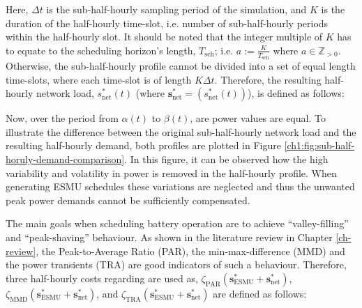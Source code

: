 Here, $\Delta t$ is the sub-half-hourly sampling period of the simulation, and $K$ is the duration of the half-hourly time-slot, i.e. number of sub-half-hourly periods within the half-hourly slot.
It should be noted that the integer multiple of $K$ has to equate to the scheduling horizon's length, $T_\text{sch}$; i.e. $a := \frac{K}{T_\text{sch}} \text{ where } a \in \mathbb{Z}_{>0}$.
Otherwise, the sub-half-hourly profile cannot be divided into a set of equal length time-slots, where each time-slot is of length $K\Delta t$.
Therefore, the resulting half-hourly network load, $s^{*}_\text{net}(t)$ (where $\textbf{s}^*_\text{net} = (s^*_\text{net}(t))$), is defined as follows:



Now, over the period from $\alpha(t)$ to $\beta(t)$, are power values are equal.
To illustrate the difference between the original sub-half-hourly network load and the resulting half-hourly demand, both profiles are plotted in Figure \ref{ch1:fig:sub-half-horuly-demand-comparison}.
In this figure, it can be observed how the high variability and volatility in power is removed in the half-hourly profile.
When generating ESMU schedules these variations are neglected and thus the unwanted peak power demands cannot be sufficiently compensated.



The main goals when scheduling battery operation are to achieve ``valley-filling'' and ``peak-shaving'' behaviour.
As shown in the literature review in Chapter \ref{ch-review}, the Peak-to-Average Ratio (PAR), the min-max-difference (MMD) and the power transients (TRA) are good indicators of such a behaviour.
Therefore, three half-hourly costs regarding are used as, $\zeta_\text{PAR}(\textbf{s}^*_\text{ESMU} + \textbf{s}^*_\text{net})$, $\zeta_\text{MMD}(\textbf{s}^*_\text{ESMU} + \textbf{s}^*_\text{net})$, and $\zeta_\text{TRA}(\textbf{s}^*_\text{ESMU} + \textbf{s}^*_\text{net})$ are defined as follows:








